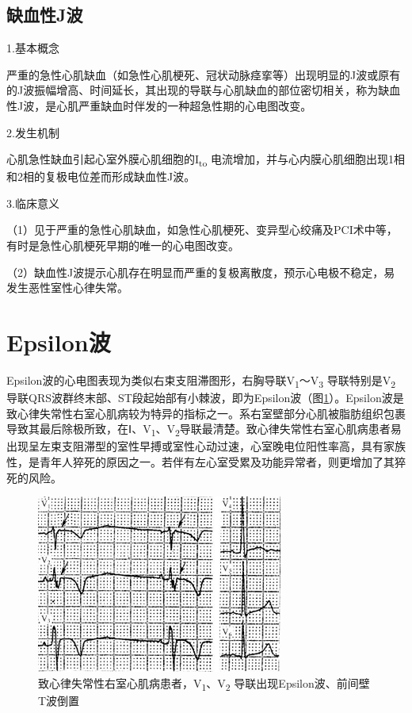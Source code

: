 \subsection{缺血性J波}

1.基本概念

严重的急性心肌缺血（如急性心肌梗死、冠状动脉痉挛等）出现明显的J波或原有的J波振幅增高、时间延长，其出现的导联与心肌缺血的部位密切相关，称为缺血性J波，是心肌严重缺血时伴发的一种超急性期的心电图改变。

2.发生机制

心肌急性缺血引起心室外膜心肌细胞的I\textsubscript{to}
电流增加，并与心内膜心肌细胞出现1相和2相的复极电位差而形成缺血性J波。

3.临床意义

（1）见于严重的急性心肌缺血，如急性心肌梗死、变异型心绞痛及PCI术中等，有时是急性心肌梗死早期的唯一的心电图改变。

（2）缺血性J波提示心肌存在明显而严重的复极离散度，预示心电极不稳定，易发生恶性室性心律失常。

\protect\hypertarget{text00010.htmlux5cux23subid70}{}{}

\section{Epsilon波}

Epsilon波的心电图表现为类似右束支阻滞图形，右胸导联V\textsubscript{1}～V\textsubscript{3} 导联特别是V\textsubscript{2}导联QRS波群终末部、ST段起始部有小棘波，即为Epsilon波（图\ref{fig4-3}）。Epsilon波是致心律失常性右室心肌病较为特异的指标之一。系右室壁部分心肌被脂肪组织包裹导致其最后除极所致，在Ⅰ、V\textsubscript{1}、V\textsubscript{2}导联最清楚。致心律失常性右室心肌病患者易出现呈左束支阻滞型的室性早搏或室性心动过速，心室晚电位阳性率高，具有家族性，是青年人猝死的原因之一。若伴有左心室受累及功能异常者，则更增加了其猝死的风险。

\begin{figure}[!htbp]
 \centering
 \includegraphics[width=3.1875in,height=2.30208in]{./images/Image00078.jpg}
 \captionsetup{justification=centering}
 \caption{致心律失常性右室心肌病患者，V\textsubscript{1}、V\textsubscript{2} 导联出现Epsilon波、前间壁T波倒置}
 \label{fig4-3}
  \end{figure} 


